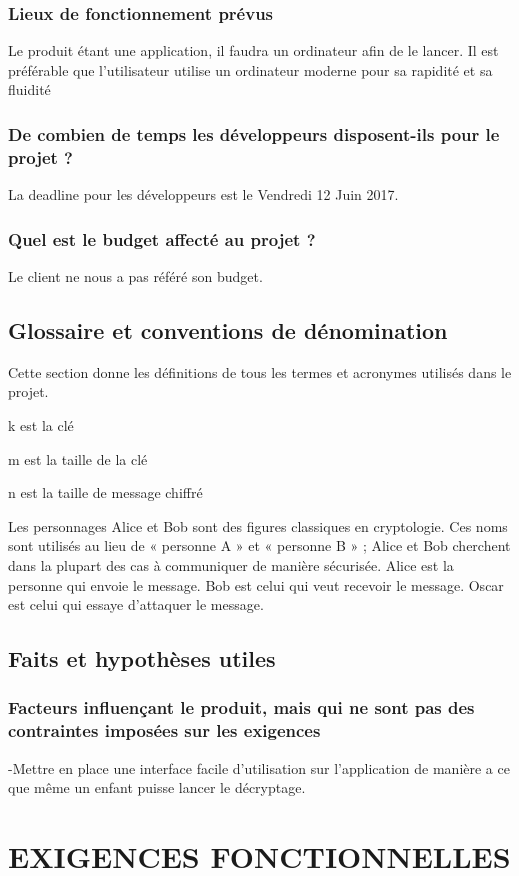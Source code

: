 \documentclass[a4]{article}
\begin{document}
			\subsubsection{Lieux de fonctionnement prévus}
				Le produit étant une application, il faudra un ordinateur afin de le lancer.
				Il est préférable que l'utilisateur utilise un ordinateur moderne pour sa rapidité et sa fluidité
			\subsubsection{ De combien de temps les développeurs disposent-ils pour le projet ?}
				La deadline pour les développeurs est le Vendredi 12 Juin 2017.
			\subsubsection{ Quel est le budget affecté au projet ?}
				Le client ne nous a pas référé son budget.
		\subsection{Glossaire et conventions de dénomination}
			Cette section donne les définitions de tous les termes et acronymes utilisés dans le projet.

			k est la clé

			m est la taille de la clé

			n est la taille de message chiffré
			
			Les personnages Alice et Bob sont des figures classiques en cryptologie. Ces noms sont utilisés au lieu de « personne A » et « personne B » ; Alice et Bob cherchent dans la plupart des cas à communiquer de manière sécurisée.
			Alice est la personne qui envoie le message.
			Bob est celui qui veut recevoir le message.
			Oscar est celui qui essaye d'attaquer le message.
		\subsection{Faits et hypothèses utiles}	
			\subsubsection{Facteurs influençant le produit, mais qui ne sont pas des contraintes imposées sur les 				exigences}
	
				-Mettre en place une interface facile d'utilisation sur l'application de manière a ce que même 					un enfant puisse lancer le décryptage.
	\section{EXIGENCES FONCTIONNELLES}
\end{document}
